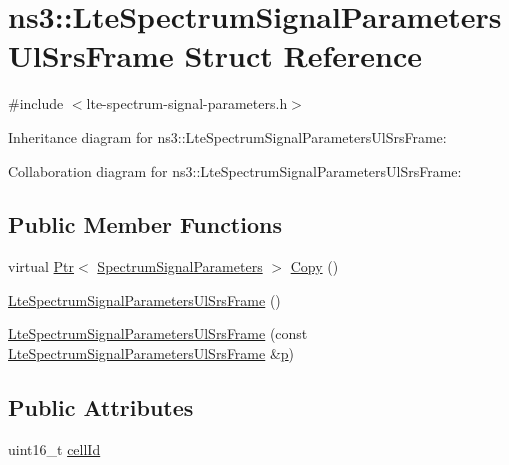 \hypertarget{structns3_1_1LteSpectrumSignalParametersUlSrsFrame}{}\section{ns3\+:\+:Lte\+Spectrum\+Signal\+Parameters\+Ul\+Srs\+Frame Struct Reference}
\label{structns3_1_1LteSpectrumSignalParametersUlSrsFrame}


{\ttfamily \#include $<$lte-\/spectrum-\/signal-\/parameters.\+h$>$}



Inheritance diagram for ns3\+:\+:Lte\+Spectrum\+Signal\+Parameters\+Ul\+Srs\+Frame\+:


Collaboration diagram for ns3\+:\+:Lte\+Spectrum\+Signal\+Parameters\+Ul\+Srs\+Frame\+:
\subsection*{Public Member Functions}
\begin{DoxyCompactItemize}
\item 
virtual \hyperlink{classns3_1_1Ptr}{Ptr}$<$ \hyperlink{structns3_1_1SpectrumSignalParameters}{Spectrum\+Signal\+Parameters} $>$ \hyperlink{structns3_1_1LteSpectrumSignalParametersUlSrsFrame_a72041a1e823976a854f751ee9253cad8}{Copy} ()
\item 
\hyperlink{structns3_1_1LteSpectrumSignalParametersUlSrsFrame_a88cce2faec35d21d557ef771bfaa6814}{Lte\+Spectrum\+Signal\+Parameters\+Ul\+Srs\+Frame} ()
\item 
\hyperlink{structns3_1_1LteSpectrumSignalParametersUlSrsFrame_ab1ad28323c7d138c4a15ffe0c2d4dce8}{Lte\+Spectrum\+Signal\+Parameters\+Ul\+Srs\+Frame} (const \hyperlink{structns3_1_1LteSpectrumSignalParametersUlSrsFrame}{Lte\+Spectrum\+Signal\+Parameters\+Ul\+Srs\+Frame} \&\hyperlink{lte__link__budget__x2__handover__measures_8m_ac9de518908a968428863f829398a4e62}{p})
\end{DoxyCompactItemize}
\subsection*{Public Attributes}
\begin{DoxyCompactItemize}
\item 
uint16\+\_\+t \hyperlink{structns3_1_1LteSpectrumSignalParametersUlSrsFrame_a80bb377e187bf069b612f237625222b0}{cell\+Id}
\end{DoxyCompactItemize}
